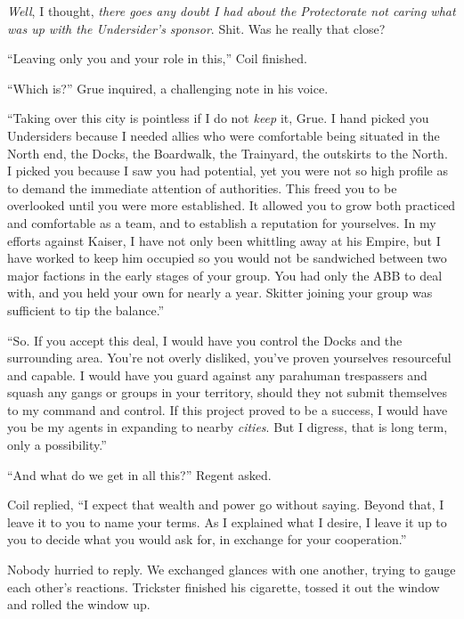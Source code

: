 \emph{Well}, I thought, \emph{there goes any doubt I had about the Protectorate not caring what was up with the Undersider's sponsor}.  Shit.  Was he really that close?



``Leaving only you and your role in this,'' Coil finished.



``Which is?'' Grue inquired, a challenging note in his voice.



``Taking over this city is pointless if I do not \emph{keep} it, Grue.  I hand picked you Undersiders because I needed allies who were comfortable being situated in the North end, the Docks, the Boardwalk, the Trainyard, the outskirts to the North.  I picked you because I saw you had potential, yet you were not so high profile as to demand the immediate attention of authorities.  This freed you to be overlooked until you were more established.  It allowed you to grow both practiced and comfortable as a team, and to establish a reputation for yourselves.  In my efforts against Kaiser, I have not only been whittling away at his Empire, but I have worked to keep him occupied so you would not be sandwiched between two major factions in the early stages of your group.  You had only the ABB to deal with, and you held your own for nearly a year.  Skitter joining your group was sufficient to tip the balance.''



``So.  If you accept this deal, I would have you control the Docks and the surrounding area.  You're not overly disliked, you've proven yourselves resourceful and capable.  I would have you guard against any parahuman trespassers and squash any gangs or groups in your territory, should they not submit themselves to my command and control.  If this project proved to be a success, I would have you be my agents in expanding to nearby \emph{cities}.  But I digress, that is long term, only a possibility.''



``And what do we get in all this?'' Regent asked.



Coil replied, ``I expect that wealth and power go without saying.  Beyond that, I leave it to you to name your terms.  As I explained what I desire, I leave it up to you to decide what you would ask for, in exchange for your cooperation.''



Nobody hurried to reply.  We exchanged glances with one another, trying to gauge each other's reactions.  Trickster finished his cigarette, tossed it out the window and rolled the window up.



